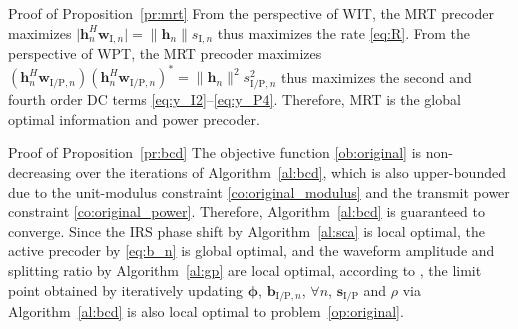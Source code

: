 \documentclass[journal]{IEEEtran}
\begin{document}
\begin{appendix}
		\begin{subsection}{Proof of Proposition~\ref{pr:mrt}}\label{ap:mrt}
			From the perspective of WIT, the MRT precoder maximizes $\lvert{\boldsymbol{h}_{n}^H \boldsymbol{w}_{\mathrm{I}, n}}\rvert = \lVert{\boldsymbol{h}_{n}}\rVert s_{\mathrm{I}, n}$ thus maximizes the rate \eqref{eq:R}. From the perspective of WPT, the MRT precoder maximizes $(\boldsymbol{h}_{n}^H \boldsymbol{w}_{\mathrm{I/P}, n})(\boldsymbol{h}_{n}^H \boldsymbol{w}_{\mathrm{I/P}, n})^* = \lVert{\boldsymbol{h}_{n}}\rVert^2 s_{\mathrm{I/P}, n}^2$ thus maximizes the second and fourth order DC terms \eqref{eq:y_I2}--\eqref{eq:y_P4}. Therefore, MRT is the global optimal information and power precoder.
		\end{subsection}

		\begin{subsection}{Proof of Proposition~\ref{pr:bcd}}\label{ap:bcd}
			The objective function \eqref{ob:original} is non-decreasing over the iterations of Algorithm~\ref{al:bcd}, which is also upper-bounded due to the unit-modulus constraint \eqref{co:original_modulus} and the transmit power constraint \eqref{co:original_power}. Therefore, Algorithm~\ref{al:bcd} is guaranteed to converge. Since the IRS phase shift by Algorithm~\ref{al:sca} is local optimal, the active precoder by \eqref{eq:b_n} is global optimal, and the waveform amplitude and splitting ratio by Algorithm~\ref{al:gp} are local optimal, according to \cite{Grippo2000}, the limit point obtained by iteratively updating $\boldsymbol{\phi}$, $\boldsymbol{b}_{\mathrm{I/P},n}$, $\forall n$, $\boldsymbol{s}_{\mathrm{I/P}}$ and $\rho$ via Algorithm~\ref{al:bcd} is also local optimal to problem~\eqref{op:original}.
		\end{subsection}
	\end{appendix}

	
	
\end{document}
